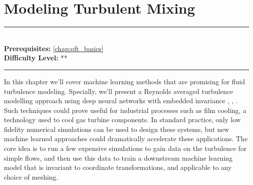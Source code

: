 \documentclass[book.tex]{subfiles}
\begin{document}

\chapter{Modeling Turbulent Mixing}

\label{chap:ml_turbulence}
\noindent\rule{11cm}{0.4pt} \\
\textbf{Prerequisites:} \autoref{chap:qft_basics}  \\
\textbf{Difficulty Level:} ** \\
\noindent\rule{11cm}{0.4pt}
\vspace{5mm}



In this chapter we'll cover machine learning methods that are promising for fluid turbulence modeling. Specially, we'll present a Reynolds averaged turbulence modelling approach using deep neural networks with embedded invariance \cite{milani2021turbulent}, \cite{milani2020generalization}, \cite{milani2019enriching}. Such techniques could prove useful for industrial processes such as film cooling, a technology used to cool gas turbine components. In standard practice, only low fidelity numerical simulations can be used to design these systems, but new machine learned approaches could dramatically accelerate these applications. The core idea is to run a few expensive simulations to gain data on the turbulence for simple flows, and then use this data to train a downstream machine learning model that is invariant to coordinate transformations, and applicable to any choice of meshing.
\end{document}
